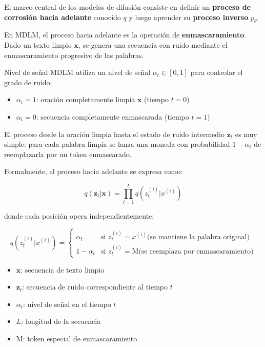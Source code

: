 El marco central de los modelos de difusión consiste en definir un \textbf{proceso de corrosión hacia adelante} conocido $q$ y luego aprender su \textbf{proceso inverso} $p_\theta$.

En MDLM, el proceso hacia adelante es la operación de \textbf{enmascaramiento}. Dado un texto limpio $\mathbf{x}$, se genera una secuencia con ruido mediante el enmascaramiento progresivo de las palabras.

\begin{importantbox}{Nivel de señal}
MDLM utiliza un nivel de señal $\alpha_t \in [0, 1]$ para controlar el grado de ruido:
\begin{itemize}
    \item $\alpha_t = 1$: oración completamente limpia $\mathbf{x}$ (tiempo $t = 0$)
    \item $\alpha_t = 0$: secuencia completamente enmascarada (tiempo $t = 1$)
\end{itemize}
El proceso desde la oración limpia hasta el estado de ruido intermedio $\mathbf{z}_t$ es muy simple: para cada palabra limpia se lanza una moneda con probabilidad $1 - \alpha_t$ de reemplazarla por un token enmascarado.
\end{importantbox}

Formalmente, el proceso hacia adelante se expresa como:

$$q(\mathbf{z}_t | \mathbf{x}) = \prod_{i=1}^{L} q(z_t^{(i)} | x^{(i)})$$

donde cada posición opera independientemente:

$$q(z_t^{(i)} | x^{(i)}) = \begin{cases} \alpha_t & \text{si } z_t^{(i)} = x^{(i)} \text{(se mantiene la palabra original)} \\ 1 - \alpha_t & \text{si } z_t^{(i)} = \text{M} \text{(se reemplaza por enmascaramiento)} \end{cases}$$

\begin{itemize}
    \item $\mathbf{x}$: secuencia de texto limpio
    \item $\mathbf{z}_t$: secuencia de ruido correspondiente al tiempo $t$
    \item $\alpha_t$: nivel de señal en el tiempo $t$
    \item $L$: longitud de la secuencia
    \item M: token especial de enmascaramiento
\end{itemize}

